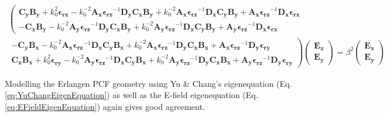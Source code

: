 \documentclass[]{article}
\begin{document}
\begin{multline}
\left(
\begin{matrix}
\mathbf{C_y} \mathbf{B_y} + k_0^2 \mathbf{\epsilon_{rx}} - k_0^{-2} \mathbf{A_x} \mathbf{\epsilon_{rz}}^{-1} \mathbf{D_y} \mathbf{C_x} \mathbf{B_y} + k_0^{-2} \mathbf{A_x} \mathbf{\epsilon_{rz}}^{-1} \mathbf{D_x} \mathbf{C_y} \mathbf{B_y} +  \mathbf{A_x} \mathbf{\epsilon_{rz}}^{-1} \mathbf{D_x} \mathbf{\epsilon_{rx}}
\\
-\mathbf{C_x} \mathbf{B_y} - k_0^{-2} \mathbf{A_y} \mathbf{\epsilon_{rz}}^{-1} \mathbf{D_y} \mathbf{C_x} \mathbf{B_y} + k_0^{-2} \mathbf{A_y} \mathbf{\epsilon_{rz}}^{-1} \mathbf{D_x} \mathbf{C_y} \mathbf{B_y} +  \mathbf{A_y} \mathbf{\epsilon_{rz}}^{-1} \mathbf{D_x} \mathbf{\epsilon_{rx}}
\end{matrix}
\right.
\\
\left.
\begin{matrix}
-\mathbf{C_y} \mathbf{B_x} - k_0^{-2} \mathbf{A_x} \mathbf{\epsilon_{rz}}^{-1} \mathbf{D_x} \mathbf{C_y} \mathbf{B_x} + k_0^{-2} \mathbf{A_x} \mathbf{\epsilon_{rz}}^{-1} \mathbf{D_y} \mathbf{C_x}\mathbf{B_x} + \mathbf{A_x} \mathbf{\epsilon_{rz}}^{-1} \mathbf{D_y} \mathbf{\epsilon_{ry}} 
\\
\mathbf{C_x} \mathbf{B_x} + k_0^2  \mathbf{\epsilon_{ry}} - k_0^{-2} \mathbf{A_y} \mathbf{\epsilon_{rz}}^{-1} \mathbf{D_x} \mathbf{C_y} \mathbf{B_x} + k_0^{-2} \mathbf{A_y} \mathbf{\epsilon_{rz}}^{-1} \mathbf{D_y} \mathbf{C_x}\mathbf{B_x} + \mathbf{A_y} \mathbf{\epsilon_{rz}}^{-1} \mathbf{D_y} \mathbf{\epsilon_{ry}} 
\end{matrix}
\right)
\begin{pmatrix}
\mathbf{E_x} \\
\mathbf{E_y}
\end{pmatrix}
=\beta^2
\begin{pmatrix}
\mathbf{E_x} \\
\mathbf{E_y}
\end{pmatrix}
\label{eq:EFieldEigenEquation}
\end{multline}

Modelling the Erlangen PCF geometry using Yu \& Chang's eigenequation (Eq. \ref{eq:YuChangEigenEquation}) as well as the E-field eigenequation (Eq. \ref{eq:EFieldEigenEquation}) again gives good agreement.
\end{document}
